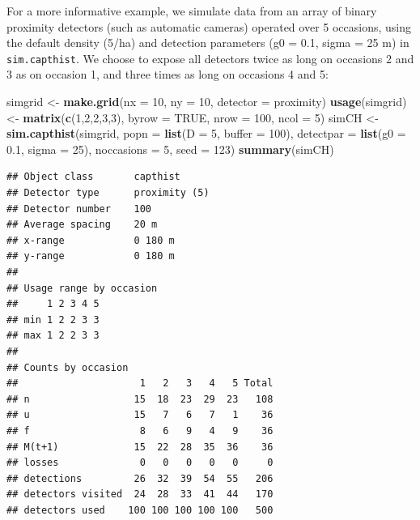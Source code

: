 \documentclass[
]{book}
\newenvironment{Shaded}{\begin{snugshade}}{\end{snugshade}}
\newcommand{\AttributeTok}[1]{\textcolor[rgb]{0.13,0.29,0.53}{#1}}
\newcommand{\ConstantTok}[1]{\textcolor[rgb]{0.56,0.35,0.01}{#1}}
\newcommand{\DecValTok}[1]{\textcolor[rgb]{0.00,0.00,0.81}{#1}}
\newcommand{\FloatTok}[1]{\textcolor[rgb]{0.00,0.00,0.81}{#1}}
\newcommand{\FunctionTok}[1]{\textcolor[rgb]{0.13,0.29,0.53}{\textbf{#1}}}
\newcommand{\NormalTok}[1]{#1}
\newcommand{\OtherTok}[1]{\textcolor[rgb]{0.56,0.35,0.01}{#1}}
\newcommand{\StringTok}[1]{\textcolor[rgb]{0.31,0.60,0.02}{#1}}
\begin{document}
For a more informative example, we simulate data from an array of binary proximity detectors (such as automatic cameras) operated over 5 occasions, using the default density (5/ha) and detection parameters (g0 = 0.1, sigma = 25 m) in \texttt{sim.capthist}. We choose to expose all detectors twice as long on occasions 2 and 3 as on occasion 1, and three times as long on occasions 4 and 5:

\begin{Shaded}
\begin{Highlighting}[]
\NormalTok{simgrid }\OtherTok{\textless{}{-}} \FunctionTok{make.grid}\NormalTok{(}\AttributeTok{nx =} \DecValTok{10}\NormalTok{, }\AttributeTok{ny =} \DecValTok{10}\NormalTok{, }\AttributeTok{detector =} \StringTok{\textquotesingle{}proximity\textquotesingle{}}\NormalTok{)}
\FunctionTok{usage}\NormalTok{(simgrid) }\OtherTok{\textless{}{-}} \FunctionTok{matrix}\NormalTok{(}\FunctionTok{c}\NormalTok{(}\DecValTok{1}\NormalTok{,}\DecValTok{2}\NormalTok{,}\DecValTok{2}\NormalTok{,}\DecValTok{3}\NormalTok{,}\DecValTok{3}\NormalTok{), }\AttributeTok{byrow =} \ConstantTok{TRUE}\NormalTok{, }\AttributeTok{nrow =} \DecValTok{100}\NormalTok{, }
    \AttributeTok{ncol =} \DecValTok{5}\NormalTok{)}
\NormalTok{simCH }\OtherTok{\textless{}{-}} \FunctionTok{sim.capthist}\NormalTok{(simgrid, }\AttributeTok{popn =} \FunctionTok{list}\NormalTok{(}\AttributeTok{D =} \DecValTok{5}\NormalTok{, }\AttributeTok{buffer =} \DecValTok{100}\NormalTok{), }
    \AttributeTok{detectpar =} \FunctionTok{list}\NormalTok{(}\AttributeTok{g0 =} \FloatTok{0.1}\NormalTok{, }\AttributeTok{sigma =} \DecValTok{25}\NormalTok{), }\AttributeTok{noccasions =} \DecValTok{5}\NormalTok{, }
    \AttributeTok{seed =} \DecValTok{123}\NormalTok{)}
\FunctionTok{summary}\NormalTok{(simCH)}
\end{Highlighting}
\end{Shaded}

\begin{verbatim}
## Object class       capthist 
## Detector type      proximity (5) 
## Detector number    100 
## Average spacing    20 m 
## x-range            0 180 m 
## y-range            0 180 m 
## 
## Usage range by occasion
##     1 2 3 4 5
## min 1 2 2 3 3
## max 1 2 2 3 3
## 
## Counts by occasion 
##                     1   2   3   4   5 Total
## n                  15  18  23  29  23   108
## u                  15   7   6   7   1    36
## f                   8   6   9   4   9    36
## M(t+1)             15  22  28  35  36    36
## losses              0   0   0   0   0     0
## detections         26  32  39  54  55   206
## detectors visited  24  28  33  41  44   170
## detectors used    100 100 100 100 100   500
\end{verbatim}
\end{document}
